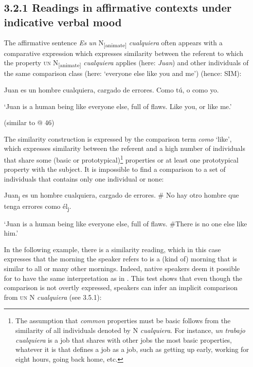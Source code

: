\subsection{\textbf{3.2.1} \textbf{Readings} \textbf{in} \textbf{affirmative} \textbf{contexts} \textbf{under} \textbf{indicative} \textbf{verbal} \textbf{mood}}

The affirmative sentence \textit{Es} \textit{un} N\textsubscript{[animate]} \textit{cualquiera} often appears with a comparative expression which expresses similarity between the referent to which the property \textsc{un} N\textsubscript{[animate]} \textit{cualquiera} applies (here: \textit{Juan}) and other individuals of the same comparison class (here: ‘everyone else like you and me’) (hence: SIM):

  Juan es un hombre cualquiera, cargado de errores. Como tú, o como yo.

  ‘Juan is a human being like everyone else, full of flaws. Like you, or like me.’

  (similar to @ 46)

The similarity construction is expressed by the comparison term \textit{como} ‘like’, which expresses similarity between the referent and a high number of individuals that share some (basic or prototypical)\footnote{{The assumption that} {\textit{common}} {properties must be basic follows from the similarity of all individuals denoted by N} {\textit{cualquiera}}{. For instance,} {\textit{un trabajo cualquiera}} {is a job that shares with other jobs the most basic properties, whatever it is that defines a job as a job, such as getting up early, working for eight hours, going back home, etc.}} properties or at least one prototypical property with the subject. It is impossible to find a comparison to a set of individuals that contains only one individual or none:

  Juan\textsubscript{j} es un hombre cualquiera, cargado de errores. \# No hay otro hombre que tenga errores como él\textsubscript{j}.

  ‘Juan is a human being like everyone else, full of flaws. \#There is no one else like him.’

In the following example, there is a similarity reading, which in this case expresses that the morning the speaker refers to is a (kind of) morning that is similar to all or many other mornings. Indeed, native speakers deem it possible for  to have the same interpretation as in . This test shows that even though the comparison is not overtly expressed, speakers can infer an implicit comparison from \textsc{un} N \textit{cualquiera} (see 3.5.1):

